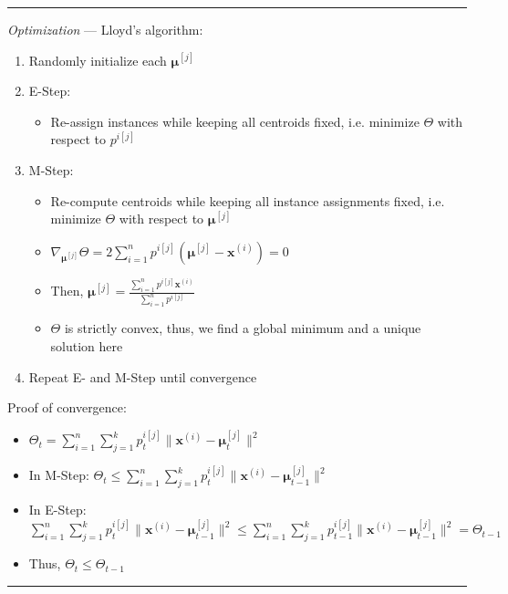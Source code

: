 {\color{lightgray}\hrule height 0.001mm}

\emph{Optimization} ---
Lloyd's algorithm: 
\begin{enumerate}
    \item Randomly initialize each $\boldsymbol{\mu}^{[j]}$
    \item E-Step:
    \begin{itemize}
        \item Re-assign instances while keeping all centroids fixed, i.e. minimize $\Theta$ with respect to $p^{i[j]}$
    \end{itemize}
    \item M-Step:
    \begin{itemize}
        \item Re-compute centroids while keeping all instance assignments fixed, i.e. minimize $\Theta$ with respect to $\boldsymbol{\mu}^{[j]}$
        \item $\nabla_{\boldsymbol{\mu}^{[j]}} \Theta = 2 \sum_{i=1}^n p^{i[j]} ( \boldsymbol{\mu}^{[j]}  - \boldsymbol{x}^{(i)} ) = 0$
        \item Then, $\boldsymbol{\mu}^{[j]} = \frac{ \sum_{i=1}^n p^{i[j]} \boldsymbol{x}^{(i)} }{ \sum_{i=1}^n p^{i[j]} }$
        \item $\Theta$ is strictly convex, thus, we find a global minimum and a unique solution here
    \end{itemize}
    \item Repeat E- and M-Step until convergence
\end{enumerate}
Proof of convergence:
\begin{itemize}
    \item $\Theta_t = \sum_{i=1}^n \sum_{j=1}^k p_t^{i[j]} \| \boldsymbol{x}^{(i)} - \boldsymbol{\mu}_t^{[j]} \|^2$
    \item In M-Step: $\Theta_t \leq \sum_{i=1}^n \sum_{j=1}^k p_t^{i[j]} \| \boldsymbol{x}^{(i)} - \boldsymbol{\mu}_{t-1}^{[j]} \|^2$
    \item In E-Step: $\sum_{i=1}^n \sum_{j=1}^k p_t^{i[j]} \| \boldsymbol{x}^{(i)} - \boldsymbol{\mu}_{t-1}^{[j]} \|^2 \leq \sum_{i=1}^n \sum_{j=1}^k p_{t-1}^{i[j]} \| \boldsymbol{x}^{(i)} - \boldsymbol{\mu}_{t-1}^{[j]} \|^2 = \Theta_{t-1}$
    \item Thus, $\Theta_t \leq \Theta_{t-1}$
\end{itemize}

{\color{lightgray}\hrule height 0.001mm}

